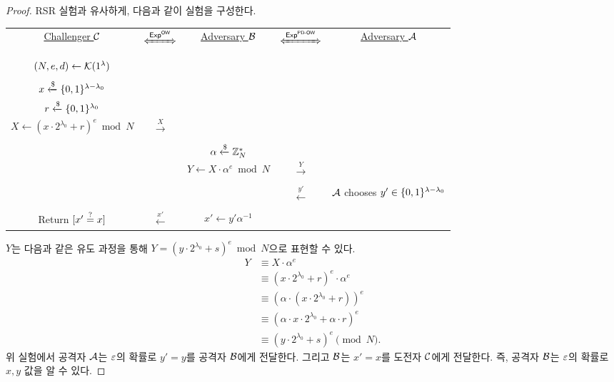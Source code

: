 \begin{proof}
    RSR 실험과 유사하게, 다음과 같이 실험을 구성한다.
    \begin{tcolorbox}[colback=white]
        \centering
        \begin{tabularx}{\linewidth}{CcCcC}
            \underline{Challenger $\mathcal{C}$} & $\xLeftrightarrow{\EXP^{\OW}}$ & \underline{Adversary $\mathcal{B}$} & $\xLeftrightarrow{\EXP^{\PDOW}}$ & \underline{Adversary $\mathcal{A}$} \\
            \\
            $(N, e, d) \gets \mathcal{K}(1^{\lambda})$ & & & & \\
            \\
            $x \xleftarrow{\$} \{0, 1\}^{\lambda - \lambda_0}$ & & & & \\
            $r \xleftarrow{\$} \{0, 1\}^{\lambda_0}$ & & & & \\
            $X \gets (x \cdot 2^{\lambda_0} + r)^e \bmod N$ & $\xrightarrow{X}$ & & & \\
            \\
            & & $\alpha \xleftarrow{\$} \mathbb{Z}_N^*$ & & \\
            & & $Y \gets X \cdot \alpha^e \bmod N$ & $\xrightarrow{Y}$ & \\
            \\
            & & & $\xleftarrow{y'}$ & $\mathcal{A}$ chooses $y' \in \{0, 1\}^{\lambda - \lambda_0}$ \\
            \\
            Return $[x' \overset{?}{=} x]$ & $\xleftarrow{x'}$ & $x' \gets y' \alpha^{-1}$ & & \\
      \end{tabularx}
    \end{tcolorbox}

    $Y$는 다음과 같은 유도 과정을 통해 $Y = (y \cdot 2^{\lambda_0} + s)^e \bmod N$으로
    표현할 수 있다.
    \begin{align*}
        Y &\equiv X \cdot \alpha^e \\ 
        &\equiv (x \cdot 2^{\lambda_0} + r)^e \cdot \alpha^e \\
        &\equiv (\alpha \cdot (x \cdot 2^{\lambda_0} + r))^e \\
        &\equiv (\alpha \cdot x \cdot 2^{\lambda_0} + \alpha \cdot r)^e \\
        &\equiv (y \cdot 2^{\lambda_0} + s)^e \pmod N.
    \end{align*}
    위 실험에서 공격자 $\mathcal{A}$는 $\varepsilon$의 확률로 $y' = y$를 공격자 $\mathcal{B}$에게 전달한다. 그리고
    $\mathcal{B}$는 $x' = x$를 도전자 $\mathcal{C}$에게 전달한다. 즉, 공격자 $\mathcal{B}$는 $\varepsilon$의
    확률로 $x, y$ 값을 알 수 있다.


\end{proof}
